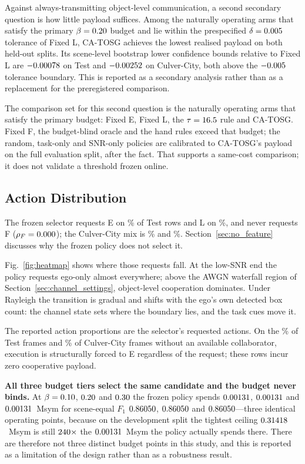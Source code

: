 \documentclass[journal]{IEEEtran}
\newcommand{\method}{CA-TOSG}
\begin{document}
Against always-transmitting object-level communication, a second secondary question is how little
payload suffices. Among the naturally operating arms that satisfy the primary
$\beta = 0.20$ budget and lie within the prespecified $\delta = 0.005$
tolerance of Fixed L, \method{} achieves the lowest realised payload on both held-out splits. Its
scene-level bootstrap lower confidence bounds relative to Fixed L are $-0.00078$ on Test and
$-0.00252$ on Culver-City, both above the $-0.005$ tolerance boundary. This is
reported as a secondary analysis rather than as a replacement for the preregistered comparison.

The comparison set for this second question is the naturally operating arms that satisfy the primary
budget: Fixed E, Fixed L, the $\tau = 16.5$ rule and \method{}. Fixed F, the budget-blind
oracle and the hand rules exceed that budget; the random, task-only and SNR-only policies are
calibrated to \method{}'s payload on the full evaluation split, after the fact. That supports a
same-cost comparison; it does not validate a threshold frozen online.

\subsection{Action Distribution}
The frozen selector requests E on \TestRhoEPct\% of Test rows and L on \TestRhoLPct\%, and never
requests F ($\rho_F = 0.000$); the Culver-City mix is \CulverRhoEPct\% and \CulverRhoLPct\%.
Section~\ref{sec:no_feature} discusses why the frozen policy does not select it.

Fig.~\ref{fig:heatmap} shows where those requests fall. At the low-SNR end the policy requests
ego-only almost everywhere; above the AWGN waterfall region of Section~\ref{sec:channel_settings},
object-level cooperation dominates. Under Rayleigh the transition is gradual and shifts with the
ego's own detected box count: the channel state sets where the boundary lies, and the task cues move
it.

The reported action proportions are the selector's requested actions. On the \TestNoCollab\% of
Test frames and \CulverNoCollab\% of Culver-City frames without an available collaborator,
execution is structurally forced to E regardless of the request; these rows incur zero cooperative
payload.

\textbf{All three budget tiers select the same candidate and the budget never binds.} At
$\beta = 0.10$, $0.20$ and $0.30$ the frozen policy spends
$0.00131$, $0.00131$ and $0.00131$~Msym for scene-equal $F_1$
$0.86050$, $0.86050$ and $0.86050$---three identical operating
points, because on the development split the tightest ceiling $0.31418$~Msym is still
$240\times$ the $0.00131$~Msym the policy actually spends there. There are therefore not three distinct
budget points in this study, and this is reported as a limitation of the design rather than as a
robustness result.
\end{document}
